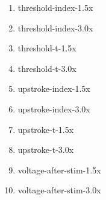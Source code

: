 \begin{enumerate}
\item threshold-index-1.5x
\item threshold-index-3.0x
\item threshold-t-1.5x
\item threshold-t-3.0x
\item upstroke-index-1.5x
\item upstroke-index-3.0x
\item upstroke-t-1.5x
\item upstroke-t-3.0x
\item voltage-after-stim-1.5x
\item voltage-after-stim-3.0x
\end{enumerate}

\begin{comment}

\chapter{Many More Results}

Each row in the table above, is dependant on a range of different final optimiser scores. 
\begin{table}[ht]
\centering
\resizebox{\textwidth}{!}{
\begin{tabular}{lllll}
\toprule{} &   observations &    predictions & Z-Scores \\
\midrule
RheobaseTest         &       190.0 pA &       168.1 pA &      0.1 \\
TimeConstantTest     &        13.8 ms &        8.12 ms &      0.2 \\
RestingPotentialTest &       -77.5 mV &      -73.82 mV &     0.02 \\
InputResistanceTest  &  132.0 megaohm &  44.91 megaohm &     0.45 \\
FITest               &     0.18 Hz/pA &   0.18 Hz/pA &        0 \\

\bottomrule
\end{tabular}}
\caption[Observation, Prediction, Z-score]{Here we see: observation, prediction and Z-score on a model, by test basis. In otherwords if you break down each of the $\chi^{2}$ values in the table above, you can track down each value to these kinds of Z-score calculations}
\end{table} 





\end{comment}
